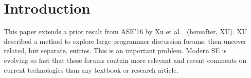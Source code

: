 \documentclass[sigconf]{acmart}
\theoremstyle{break}
\begin{document}
%
%





\maketitle

% 


\section{Introduction}


This paper extends a prior result from ASE'16 by
 Xu et al.~\cite{xu2016predicting} (hereafter, XU). XU described
 a method to
 explore large programmer discussion forums, then 
 uncover related, but separate, entries.
 This is an important problem. Modern SE
 is evolving so fast that these  forums
 contain more relevant and recent comments on 
 current technologies than any textbook or research article.
 
\end{document}
